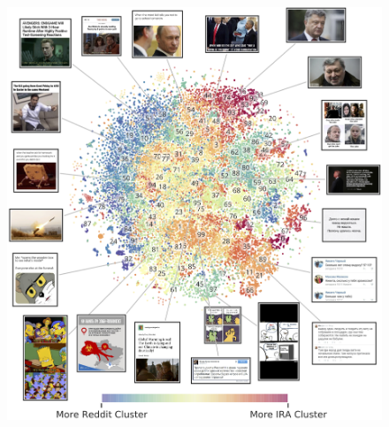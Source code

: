 \documentclass[article,36pt,extrafontsizes,oneside,openany,oldfontcommands]{memoir}
\begin{document}
\begin{adjmulticols*}{3}{0.5in}{0.5in}
  \begin{figure}
    \vspace{2cm} \hspace{2.5cm} 
    \includegraphics[width=1.25\linewidth]{figure/meme-cluster-tsne-rank-annotated.png}
  \end{figure}



\end{adjmulticols*}
\end{document}
